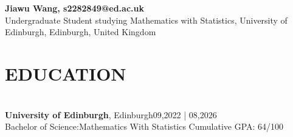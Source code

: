 \documentclass[a4paper,9pt]{extarticle}
\begin{document}
\pagestyle{fancy}
\renewcommand{\headrulewidth}{0pt}
\fancyhead{}
\thispagestyle{empty} %

\begin{flushleft}
\textbf{\LARGE  Jiawu Wang, {s2282849@ed.ac.uk}}\\[2pt] %
Undergraduate Student studying Mathematics with Statistics, University of Edinburgh, Edinburgh, United Kingdom
\end{flushleft}

\section*{EDUCATION}
\noindent\\
\textbf{University of Edinburgh},  Edinburgh\hfill 09,2022  | 08,2026 \\ %
Bachelor of Science:Mathematics With Statistics \hfill Cumulative GPA: 64/100 %


\end{document}
